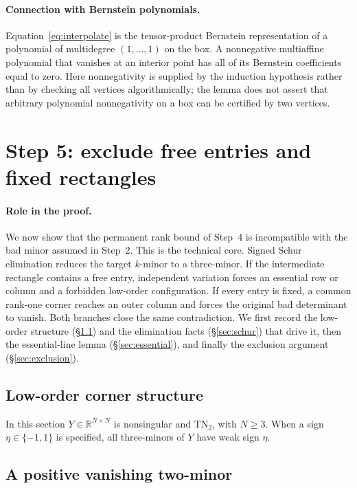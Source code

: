 \documentclass[10pt,a4paper]{article}
\theoremstyle{definition}
\theoremstyle{remark}
\numberwithin{equation}{section}
\newcommand{\R}{\mathbb R}
\begin{document}
\paragraph{Connection with Bernstein polynomials.}
Equation~\eqref{eq:interpolate} is the tensor-product Bernstein
representation of a polynomial of multidegree $(1,\ldots,1)$ on the box.
A nonnegative multiaffine polynomial that vanishes at an interior point
has all of its Bernstein coefficients equal to zero. Here nonnegativity is
supplied by the induction hypothesis rather than by checking all vertices
algorithmically; the lemma does not assert that arbitrary polynomial
nonnegativity on a box can be certified by two vertices.

\section{Step 5: exclude free entries and fixed rectangles}\label{sec:induction}

\paragraph{Role in the proof.}
We now show that the permanent rank bound of Step~4 is incompatible with
the bad minor assumed in Step~2. This is the technical core. Signed Schur
elimination reduces the target $k$-minor to a three-minor. If the
intermediate rectangle contains a free entry, independent variation
forces an essential row or column and a forbidden low-order
configuration. If every entry is fixed, a common rank-one corner reaches
an outer column and forces the original bad determinant to vanish. Both
branches close the same contradiction. We first record the low-order
structure (\S\ref{sec:corners}) and the elimination facts
(\S\ref{sec:schur}) that drive it, then the essential-line lemma
(\S\ref{sec:essential}), and finally the exclusion argument
(\S\ref{sec:exclusion}).

\subsection{Low-order corner structure}\label{sec:corners}

In this section $Y\in\R^{N\times N}$ is nonsingular and
$\mathrm{TN}_2$, with $N\geq3$. When a sign $\eta\in\{-1,1\}$
is specified, all three-minors of $Y$ have weak sign $\eta$.

\subsection{A positive vanishing two-minor}
\end{document}
